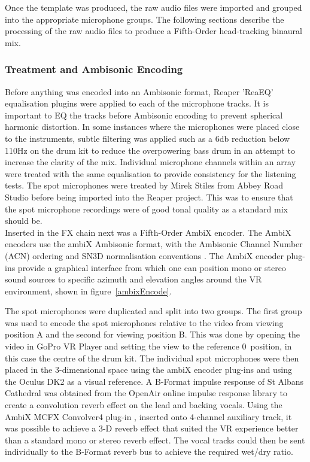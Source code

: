 				Once the template was produced, the raw audio files were imported and grouped into the appropriate microphone groups. The following sections describe the processing of the raw audio files to produce a Fifth-Order head-tracking binaural mix. \\

			\subsubsection{Treatment and Ambisonic Encoding}
				Before anything was encoded into an Ambisonic format, Reaper 'ReaEQ' equalisation plugins were applied to each of the microphone tracks. It is important to EQ the tracks before Ambisonic encoding to prevent spherical harmonic distortion. In some instances where the microphones were placed close to the instruments, subtle filtering was applied such as a 6db reduction below 110Hz on the drum kit to reduce the overpowering bass drum in an attempt to increase the clarity of the mix. Individual microphone channels within an array were treated with the same equalisation to provide consistency for the listening tests. The spot microphones were treated by Mirek Stiles from Abbey Road Studio before being imported into the Reaper project. This was to ensure that the spot microphone recordings were of good tonal quality as a standard mix should be. \\

				Inserted in the FX chain next was a Fifth-Order AmbiX encoder. The AmbiX encoders use the ambiX Ambisonic format, with the Ambisonic Channel Number (ACN) ordering and SN3D normalisation conventions \cite{AmbixFORMAT}. The AmbiX encoder plug-ins provide a graphical interface from which one can position mono or stereo sound sources to specific azimuth and elevation angles around the VR environment, shown in figure~\ref{ambixEncode}.

				The spot microphones were duplicated and split into two groups. The first group was used to encode the spot microphones relative to the video from viewing position A and the second for viewing position B. This was done by opening the video in GoPro VR Player and setting the view to the reference 0\textdegree~position, in this case the centre of the drum kit. The individual spot microphones were then placed in the 3-dimensional space using the ambiX encoder plug-ins and using the Oculus DK2 as a visual reference. A B-Format impulse response of St Albans Cathedral \cite{OpenAir} was obtained from the OpenAir online impulse response library to create a convolution reverb effect on the lead and backing vocals. Using the AmbiX MCFX Convolver4 plug-in \cite{AmbixPLUGINS}, \cite{AmbixDOWNLOAD} inserted onto 4-channel auxiliary track, it was possible to achieve a 3-D reverb effect that suited the VR experience better than a standard mono or stereo reverb effect. The vocal tracks could then be sent individually to the B-Format reverb bus to achieve the required wet/dry ratio.

